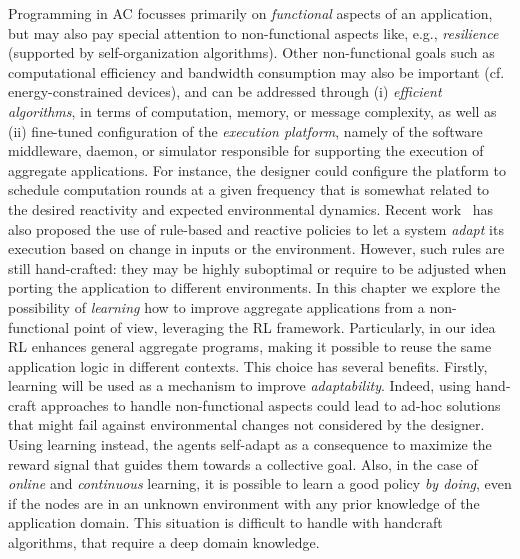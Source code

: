 Programming in \ac{AC}
 focusses primarily on \emph{functional} aspects of an application,
 but may also pay special attention to non-functional aspects like, e.g., \emph{resilience} (supported by self-organization algorithms).
%
Other non-functional goals such as computational efficiency and bandwidth consumption may also be important (cf. energy-constrained devices), 
 and can be addressed through (i) \emph{efficient algorithms}, in terms of computation, memory, or message complexity,
 as well as 
 (ii) fine-tuned configuration of the \emph{execution platform}, namely of the software middleware, daemon, or simulator responsible for supporting the execution of aggregate applications. 
%
%
%
For instance, the designer could configure the platform 
 to schedule computation rounds 
 at a given frequency
 that is somewhat related to the desired reactivity
 and expected environmental dynamics.
%
Recent work~\cite{danilo2021lmcs} has also proposed the use of rule-based and reactive policies to let a system \emph{adapt} its execution based on change in inputs or the environment.
%
However, such rules are still hand-crafted: they may be highly suboptimal or require to be adjusted when porting the application to different environments.
%
In this chapter we explore the possibility of \emph{learning} 
 how to improve aggregate applications from a non-functional point of view, 
 leveraging the \ac{RL} framework.
%
%
Particularly, in our idea \ac{RL} enhances general aggregate programs, 
 making it possible to reuse the same application logic in different contexts.
%
This choice has several benefits.
 Firstly, learning will be used as a mechanism to improve \emph{adaptability}. 
 Indeed, using hand-craft approaches to handle non-functional aspects 
 could lead to ad-hoc solutions that might fail against environmental 
 changes not considered by the designer.
%
Using learning instead, the agents self-adapt as a consequence 
 to maximize the reward signal that guides them towards a collective goal. 
%
Also, in the case of \emph{online} and \emph{continuous} learning, 
 it is possible to learn a good policy \emph{by doing}, 
 even if the nodes are in an unknown environment with any prior knowledge of the application domain.
%
This situation is difficult to handle with handcraft algorithms, that require a deep domain knowledge.

